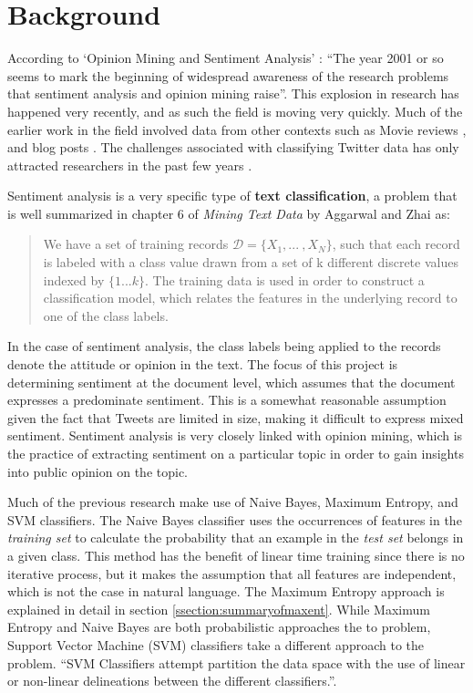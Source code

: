\documentclass[final,3p,12pt]{elsarticle}
\begin{document}
\section{Background}
\label{section:background}

According to `Opinion Mining and Sentiment Analysis' \cite{Pang2008}: ``The
year 2001 or so seems to mark the beginning of widespread awareness of the
research problems that sentiment analysis and opinion mining raise''. This
explosion in research has happened very recently, and as such the field is
moving very quickly. Much of the earlier work in the field involved data from
other contexts such as Movie reviews \cite{Pang2002}, and blog posts
\cite{Melville2009}. The challenges associated with classifying Twitter data
has only attracted researchers in the past few years \cite{Jianfeng2013}
\cite{Barbosa2010} \cite{Gokulakrishnan2012}.

Sentiment analysis is a very specific type of \textbf{text classification}, a
problem that is well summarized in chapter 6 of \textit{Mining Text Data} by
Aggarwal and Zhai \cite{Aggarwal2012} as:

\begin{quote}
    We have a set of training records $\mathcal{D} = \{X_{1} , . . .\ , X_{N}
    \}$, such that each record is labeled with a class value drawn from a set
    of k different discrete values indexed by $\{1 . . . k\}$. The training
    data is used in order to construct a classification model, which relates
    the features in the underlying record to one of the class labels.
\end{quote}

In the case of sentiment analysis, the class labels being applied to the
records denote the attitude or opinion in the text. The focus of this project
is determining sentiment at the document level, which assumes that the document
expresses a predominate sentiment. This is a somewhat reasonable assumption
given the fact that Tweets are limited in size, making it difficult to express
mixed sentiment. Sentiment analysis is very closely linked with opinion mining,
which is the practice of extracting sentiment on a particular topic in order to
gain insights into public opinion on the topic.

Much of the previous research make use of Naive Bayes, Maximum Entropy, and SVM
classifiers. The Naive Bayes classifier uses the occurrences of features in the
\textit{training set} to calculate the probability that an example in the
\textit{test set} belongs in a given class. This method has the benefit of
linear time training since there is no iterative process, but it makes the
assumption that all features are independent, which is not the case in natural
language. The Maximum Entropy approach is explained in detail in section
\ref{ssection:summaryofmaxent}. While Maximum Entropy and Naive Bayes are both
probabilistic approaches the to problem, Support Vector Machine (SVM)
classifiers take a different approach to the problem. ``SVM Classifiers attempt
partition the data space with the use of linear or non-linear delineations
between the different classifiers.''\cite{Aggarwal2012}.
\end{document}
